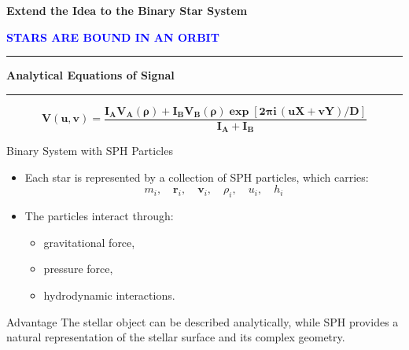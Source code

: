 \documentclass{beamer}
\begin{document}
    \begin{frame}
    	\centering    	
    	{\Large\textbf{Extend the Idea to the Binary Star System}}    	
    	\vspace{0.2cm}    
    		
    	{\textbf{\textcolor{blue}{STARS ARE BOUND IN AN ORBIT}}}    	
    	\vspace{0.35cm}   
    	 	
    	{\color{blue}\rule{0.25\textwidth}{1.5pt}}
    	\hspace{0.15cm}    	
    	{\color{red}\textbf{\Large Analytical Equations of Signal}}
    	\hspace{0.15cm}    	
    	{\color{blue}\rule{0.25\textwidth}{1.5pt}}    	
    	\vspace{0.1cm}    	
    	\begin{equation*}
    		\mathbf{V(u,v) =
    		\frac{
    			I_A V_A(\rho)
    			+ I_B V_B(\rho)
    			\exp\left[2\pi i\,(uX+vY)/D\right]
    		}
    		{I_A+I_B}}
    	\end{equation*}    	
    \end{frame}

    \begin{frame}{Binary System with SPH Particles}   	
    	\begin{itemize}
    		\item Each star is represented by a collection of SPH particles, which carries:
    		\[
    		m_i,\quad \mathbf r_i,\quad \mathbf v_i,\quad
    		\rho_i,\quad u_i,\quad h_i
    		\]   		
    		\item The particles interact through:
    		\begin{itemize}
    			\item gravitational force,
    			\item pressure force,
    			\item hydrodynamic interactions.
    		\end{itemize}
    	\end{itemize}
    	
    	\begin{block}{Advantage}
    		\centering
    		The stellar object can be described analytically, while SPH provides a natural representation of the stellar surface and its complex geometry.
    	\end{block}    	
    \end{frame}
\end{document}
